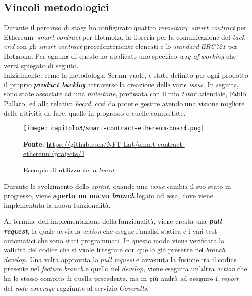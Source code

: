 
\subsection{Vincoli metodologici}
Durante il percorso di stage ho configurato quattro \textit{repository}: \textit{smart contract} per Ethereum, \textit{smart contract} per Hotmoka, la libreria per la comunicazione del \textit{back-end} con gli \textit{smart contract} precedentemente elencati e lo \textit{standard ERC721} per Hotmoka. Per ognuna di queste ho applicato uno specifico \textit{way of working} che verrà spiegato di seguito. \\

Inizialmente, come la metodologia Scrum vuole, è stato definito per ogni prodotto il proprio \textbf{\textit{product backlog}} attraverso la creazione delle varie \textit{issue}. In seguito, sono state associate ad una \textit{milestone}, prefissata con il mio \textit{tutor} aziendale, Fabio Pallaro, ed alla relativa \textit{board}, così da poterle gestire avendo una visione migliore delle attività da fare, quelle in progresso e quelle completate.

\begin{figure}[h!]
  \centering
  \texttt{[image: capitolo3/smart-contract-ethereum-board.png]}
  \caption{Esempio di utilizzo della \textit{board}}
  \textbf{Fonte}: \href{https://github.com/NFT-Lab/smart-contract-ethereum/projects/1}{https://github.com/NFT-Lab/smart-contract-ethereum/projects/1}
\end{figure}

Durante lo svolgimento dello \textit{sprint}, quando una \textit{issue} cambia il suo stato in progresso, viene \textbf{aperto un nuovo \textit{branch}} legato ad essa, dove viene implementata la nuova funzionalità.

Al termine dell'implementazione della funzionalità, viene creata una \textbf{\textit{pull request}}, la quale avvia la \textit{action} che esegue l'analisi statica e i vari test automatici che sono stati programmati. In questo modo viene verificata la validità del codice che si vuole integrare con quello già presente nel \textit{branch develop}. Una volta approvata la \textit{pull request} e avvenuta la fusione tra il codice presente nel \textit{feature branch} e quello nel \textit{develop}, viene eseguita un'altra \textit{action} che ha lo stesso compito di quella precedente, ma in più andrà ad eseguire il \textit{report} del \textit{code coverage} raggiunto al servizio \textit{Coveralls}.

